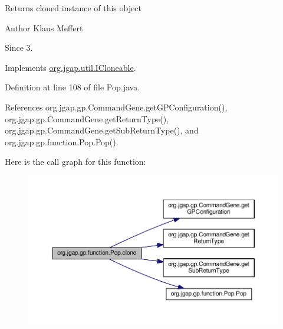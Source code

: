 \begin{DoxyReturn}{Returns}
cloned instance of this object
\end{DoxyReturn}
\begin{DoxyAuthor}{Author}
Klaus Meffert 
\end{DoxyAuthor}
\begin{DoxySince}{Since}
3. 
\end{DoxySince}


Implements \hyperlink{interfaceorg_1_1jgap_1_1util_1_1_i_cloneable_aa7e7d62077e6428ad7904932b1b4f7d5}{org.\-jgap.\-util.\-I\-Cloneable}.



Definition at line 108 of file Pop.\-java.



References org.\-jgap.\-gp.\-Command\-Gene.\-get\-G\-P\-Configuration(), org.\-jgap.\-gp.\-Command\-Gene.\-get\-Return\-Type(), org.\-jgap.\-gp.\-Command\-Gene.\-get\-Sub\-Return\-Type(), and org.\-jgap.\-gp.\-function.\-Pop.\-Pop().



Here is the call graph for this function\-:
\nopagebreak
\begin{figure}[H]
\begin{center}
\leavevmode
\includegraphics[width=350pt]{classorg_1_1jgap_1_1gp_1_1function_1_1_pop_a27a9599099a5bb314a81e995f9b2d726_cgraph}
\end{center}
\end{figure}



